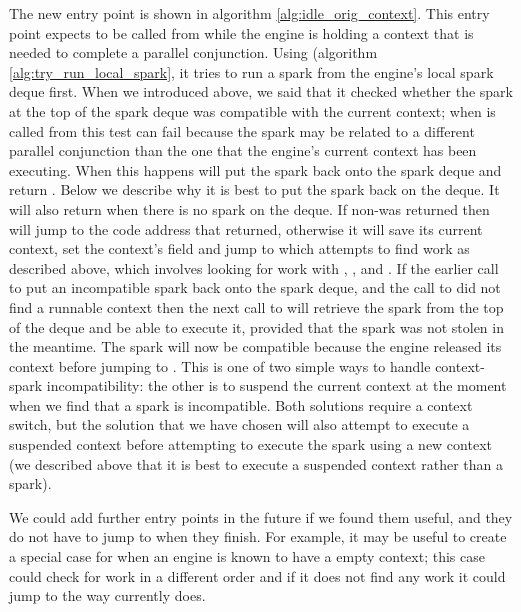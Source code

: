 The new entry point \idleorigcontext is shown in algorithm
\ref{alg:idle_orig_context}.
This entry point expects to be called from \joinandcontinue while the engine
is holding a context that is needed to complete a parallel conjunction.
Using \tryrunlocalspark (algorithm \ref{alg:try_run_local_spark},
it tries to run a spark from the engine's local spark deque first.
When we introduced \tryrunlocalspark above,
we said that it checked whether the spark at the top of the spark deque was
compatible with the current context;
when \tryrunlocalspark is called from \idleorigcontext this test can fail
because the spark may be related to a different parallel conjunction than
the one that the engine's current context has been executing.
When this happens \tryrunlocalspark will put the spark back onto the spark
deque and return \NULL.
Below we describe why it is best to put the spark back on the deque.
It will also return \NULL when there is no spark on the deque.
If non-\NULL was returned then \idleorigcontext will jump to the code
address that \tryrunlocalspark returned,
otherwise it will save its current context,
set the context's  field
and jump to \idle which attempts to find work as described above,
which involves looking for work with \tryruncontext, \tryrunlocalspark, and
\trystealspark.
If the earlier call to \tryrunlocalspark put an incompatible spark back onto
the spark deque,
and the call to \tryruncontext did not find a runnable context then
the next call to \tryrunlocalspark
will retrieve the spark from the top of the deque and be able to execute it,
provided that the spark was not stolen in the meantime.
The spark will now be compatible because the engine released its context
before jumping to \idle.
This is one of two simple ways to handle context-spark incompatibility:
the other is to suspend the current context at the moment when we find that
a spark is incompatible.
Both solutions require a context switch,
but the solution that we have chosen will also attempt to execute a
suspended context before attempting to execute the spark using a new context
(we described above that it is best to execute a suspended context rather
than a spark).

We could add further entry points in the future if we found them useful,
and they do not have to jump to \idle when they finish.
For example,
it may be useful to create a special case for when an engine is known to
have a empty context;
this case could check for work in a different order and if it does not
find any work it could jump to \sleep the way \idle currently does.

